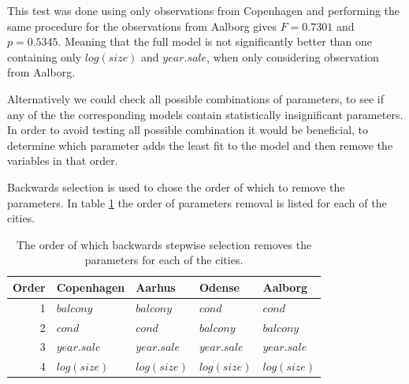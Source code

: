 This test was done using only observations from Copenhagen and performing the same procedure for the observations from Aalborg gives $F=0.7301$ and $p=0.5345$.
Meaning that the full model is not significantly better than one containing only $log(size)$ and $year.sale$, when only considering observation from Aalborg.

Alternatively we could check all possible combinations of parameters, to see if any of the the corresponding models contain statistically insignificant parameters.
In order to avoid testing all possible combination it would be beneficial, to determine which parameter adds the least fit to the model and then remove the variables in that order. 


Backwards selection is used to chose the order of which to remove the parameters.
In table \ref{tbl:backward_order_of_parameters} the order of parameters removal is listed for each of the cities.
    
\begin{table}[H]
    \centering
    \begin{tabular}{r|llll}
        \toprule
        \textbf{Order} & \textbf{Copenhagen} & \textbf{Aarhus} & \textbf{Odense} & \textbf{Aalborg}\\
        \midrule
        1 & $balcony$              & $balcony$         & $cond$            & $cond$ \\
        2 & $cond$           & $cond$            & $balcony$         & $balcony$ \\
        3 & $year.sale$    & $year.sale$  & $year.sale$  & $year.sale$ \\
        4 & $log(size)$         & $log(size)$       & $log(size)$       & $log(size)$ \\
        \bottomrule
    \end{tabular}
    \caption{The order of which backwards stepwise selection removes the parameters for each of the cities.}
    \label{tbl:backward_order_of_parameters}
\end{table}

